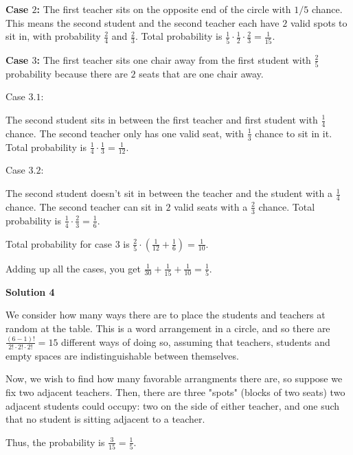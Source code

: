 \begin{enumerate}
 


 \textbf{Case $2$:} The first teacher sits on the opposite end of the circle with $1/5$ chance. This means the second student and the second teacher each have $2$ valid spots to sit in, with probability $\frac{2}{4}$ and $\frac{2}{3}$. Total probability is $\frac{1}{5}\cdot \frac{1}{2}\cdot \frac{2}{3} = \frac{1}{15}$.

 


 \textbf{Case $3$:} The first teacher sits one chair away from the first student with $\frac{2}{5}$ probability because there are $2$ seats that are one chair away. 

 Case $3.1$:

 The second student sits in between the first teacher and first student with $\frac{1}{4}$ chance. The second teacher only has one valid seat, with $\frac{1}{3}$ chance to sit in it. Total probability is $\frac{1}{4}\cdot \frac{1}{3} = \frac{1}{12}$.

 Case $3.2$:

 The second student doesn't sit in between the teacher and the student with a $\frac{1}{4}$ chance. The second teacher can sit in $2$ valid seats with a $\frac{2}{3}$ chance. Total probability is $\frac{1}{4}\cdot \frac{2}{3} = \frac{1}{6}$.

 Total probability for case $3$ is $\frac{2}{5}\cdot (\frac{1}{12} + \frac{1}{6}) = \frac{1}{10}$.

 
Adding up all the cases, you get $\frac{1}{30} + \frac{1}{15} + \frac{1}{10} = \boxed{\frac{1}{5}}$.

 



\textbf{Solution 4}

We consider how many ways there are to place the students and teachers at random at the table. This is a word arrangement in a circle, and so there are $\frac{(6-1)!}{2! \cdot 2!\cdot 2!}=15$ different ways of doing so, assuming that teachers, students and empty spaces are indistinguishable between themselves. 

 Now, we wish to find how many favorable arrangments there are, so suppose we fix two adjacent teachers. Then, there are three "spots" (blocks of two seats) two adjacent students could occupy: two on the side of either teacher, and one such that no student is sitting adjacent to a teacher.

 Thus, the probability is $\frac{3}{15}=\boxed{\frac{1}{5}}$.

 




\end{enumerate}
